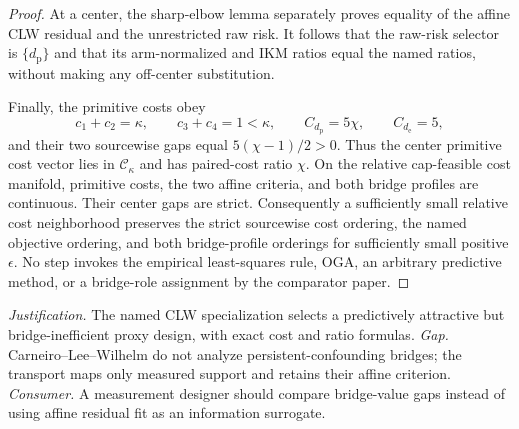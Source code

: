 \documentclass{article}
\begin{document}
\begin{proof}
At a center, the sharp-elbow lemma separately proves equality of the affine CLW residual and the unrestricted raw risk.  It follows that the raw-risk selector is \(\{d_{\mathrm p}\}\) and that its arm-normalized and IKM ratios equal the named ratios, without making any off-center substitution.

Finally, the primitive costs obey
\[
 c_1+c_2=\kappa,
 \qquad c_3+c_4=1<\kappa,
 \qquad C_{d_{\mathrm p}}=5\chi,
 \qquad C_{d_{\mathrm e}}=5,
\]
and their two sourcewise gaps equal \(5(\chi-1)/2>0\).  Thus the center primitive cost vector lies in \(\mathcal C_\kappa\) and has paired-cost ratio \(\chi\).  On the relative cap-feasible cost manifold, primitive costs, the two affine criteria, and both bridge profiles are continuous.  Their center gaps are strict.  Consequently a sufficiently small relative cost neighborhood preserves the strict sourcewise cost ordering, the named objective ordering, and both bridge-profile orderings for sufficiently small positive \(\epsilon\).  No step invokes the empirical least-squares rule, OGA, an arbitrary predictive method, or a bridge-role assignment by the comparator paper.
\end{proof}
\par\smallskip\noindent \textit{Justification.} The named CLW specialization selects a predictively attractive but bridge-inefficient proxy design, with exact cost and ratio formulas. \textit{Gap.} Carneiro--Lee--Wilhelm do not analyze persistent-confounding bridges; the transport maps only measured support and retains their affine criterion. \textit{Consumer.} A measurement designer should compare bridge-value gaps instead of using affine residual fit as an information surrogate.
\end{document}
